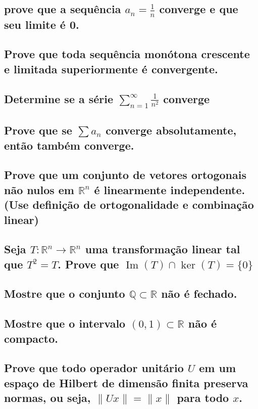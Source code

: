 \documentclass{article}
\begin{document}
\subsection{prove que a sequência $a_n = \frac{1}{n}$ converge e que seu limite é 0.}

\subsection{Prove que toda sequência monótona crescente e limitada superiormente é convergente.}

\subsection{Determine se a série $\sum_{n=1}^{\infty} \frac{1}{n^2}$ converge}

\subsection{Prove que se $\sum a_n$ converge absolutamente, então também converge.}

\subsection{Prove que um conjunto de vetores ortogonais não nulos em $\mathbb{R}^n$ é linearmente independente. (Use definição de ortogonalidade e combinação linear)}

\subsection{Seja $T: \mathbb{R}^n \to \mathbb{R}^n$ uma transformação linear tal que $T^2 = T$. Prove que $\operatorname{Im}(T) \cap \ker(T) = \{0\}$}

\subsection{Mostre que o conjunto $\mathbb{Q} \subset \mathbb{R}$ não é fechado.}

\subsection{Mostre que o intervalo $(0,1) \subset \mathbb{R}$ não é compacto.}

\subsection{Prove que todo operador unitário $U$ em um espaço de Hilbert de dimensão finita preserva normas, ou seja, $\|Ux\| = \|x\|$ para todo $x$.}
\end{document}
